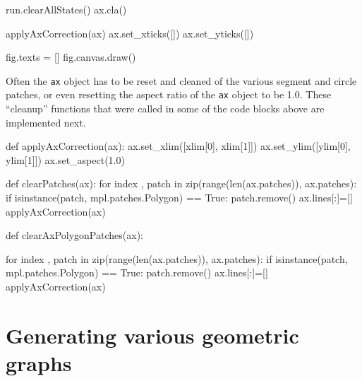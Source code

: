 \nwenddocs{}\endmoddef\nwstartdeflinemarkup{}\nwenddeflinemarkup
run.clearAllStates()
ax.cla()
                                 
applyAxCorrection(ax)
ax.set_xticks([])
ax.set_yticks([])
                                    
fig.texts = []
fig.canvas.draw()
\nwendcode{}\nwdocspar





Often the \verb|ax| object has to be reset and cleaned of the various segment and circle patches, or even resetting the 
aspect ratio of the \verb|ax| object to be 1.0. These ``cleanup'' functions that were called in some of the code blocks above 
are implemented next. 

\nwenddocs{}\plusendmoddef\nwstartdeflinemarkup{}\nwenddeflinemarkup
def applyAxCorrection(ax):
      ax.set_xlim([xlim[0], xlim[1]])
      ax.set_ylim([ylim[0], ylim[1]])
      ax.set_aspect(1.0)

def clearPatches(ax):
    for index , patch in zip(range(len(ax.patches)), ax.patches):
        if isinstance(patch, mpl.patches.Polygon) == True:
            patch.remove()
    ax.lines[:]=[]
    applyAxCorrection(ax)

def clearAxPolygonPatches(ax):

    for index , patch in zip(range(len(ax.patches)), ax.patches):
        if isinstance(patch, mpl.patches.Polygon) == True:
            patch.remove()
    ax.lines[:]=[]
    applyAxCorrection(ax)
\nwendcode{}\nwdocspar


\section{Generating various geometric graphs}

